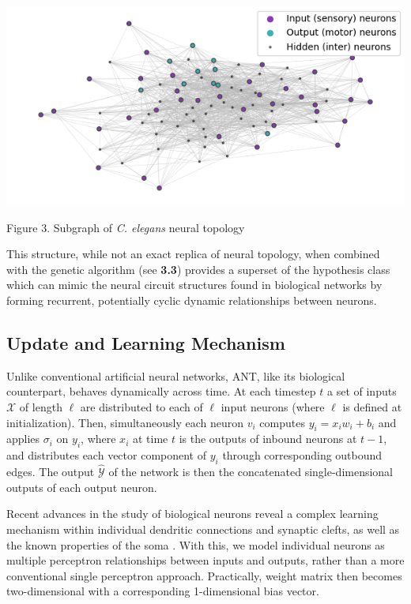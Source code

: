 \documentclass{article}
\begin{document}
\begin{multicols}{2}
	\vspace{5pt}
	\includegraphics[scale=0.58]{figs/celegans_architecture_2.png}
	\begin{center}
		\small Figure 3. Subgraph of \textit{C. elegans} neural topology \cite{varshney2011}
	\end{center}

	This structure, while not an exact replica of neural topology, when combined with the genetic algorithm (see \textbf{3.3}) provides a superset of the hypothesis class which can mimic the neural circuit structures found in biological networks by forming recurrent, potentially cyclic dynamic relationships between neurons.
	
	\subsection{Update and Learning Mechanism} 
	
	Unlike conventional artificial neural networks, ANT, like its biological counterpart, behaves dynamically across time. At each timestep $t$ a set of inputs $\mathcal{X}$ of length $\ell$ are distributed to each of $\ell$ input neurons (where $\ell$ is defined at initialization). Then, simultaneously each neuron $v_i$ computes $y_i = x_iw_i + b_i$ and applies $\sigma_i$ on $y_i$, where $x_i$ at time $t$ is the outputs of inbound neurons at $t - 1$, and distributes each vector component of $y_i$ through corresponding outbound edges. The output $\hat{\mathcal{Y}}$ of the network is then the concatenated single-dimensional outputs of each output neuron.
	
	Recent advances in the study of biological neurons reveal a complex learning mechanism within individual dendritic connections and synaptic clefts, as well as the known properties of the soma \cite{dendrite1} \cite{dendrite2} \cite{dendrite3} \cite{dendrite4}. With this, we model individual neurons as multiple perceptron relationships between inputs and outputs, rather than a more conventional single perceptron approach. Practically, weight matrix then becomes two-dimensional with a corresponding 1-dimensional bias vector.
	

\end{multicols}
\end{document}
